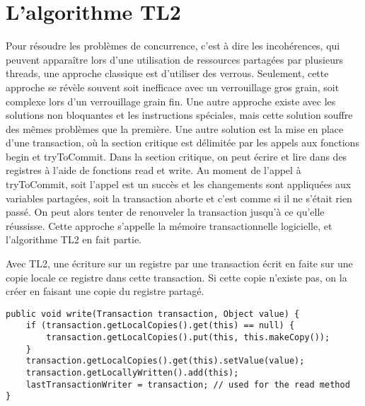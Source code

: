 \documentclass[10pt, a4paper]{article}
\title{\mytitle}
\author{\myauthor\hspace{1em}\\\contact\\Université de Nantes\hspace{0.5em}-\hspace{0.5em}\mymodule}
\date{}
\begin{document}
    \maketitle
    \begin{abstract}
	Ce document est un rapport du projet de mémoire transactionelle logicielle du module de programmation multi-coeurs. On discutera en particulier de la propriété de vivacité sur les transactions garantie par l’algorithme TL2.
    \end{abstract}

\section{L'algorithme TL2}
Pour résoudre les problèmes de concurrence, c'est à dire les incohérences, qui peuvent apparaître lors d'une utilisation de ressources partagées par plusieurs threads, une approche classique est d'utiliser des verrous.
Seulement, cette approche se révèle souvent soit inefficace avec un verrouillage gros grain, soit complexe lors d'un verrouillage grain fin. Une autre approche existe avec les solutions non bloquantes et les instructions spéciales, mais cette solution souffre des mêmes problèmes que la première. Une autre solution est la mise en place d'une transaction, où la section critique est délimitée par les appels aux fonctions begin et tryToCommit. Dans la section critique, on peut écrire et lire dans des registres à l'aide de fonctions read et write. Au moment de l'appel à tryToCommit, soit l'appel est un succès et les changements sont appliquées aux variables partagées, soit la transaction aborte et c'est comme si il ne s'était rien passé. On peut alors tenter de renouveler la transaction jusqu'à ce qu'elle réussisse. Cette approche s'appelle la mémoire transactionnelle logicielle, et l'algorithme TL2 en fait partie. 

Avec TL2, une écriture sur un registre par une transaction écrit en faite sur une copie locale ce registre dans cette transaction. Si cette copie n'existe pas, on la créer en faisant une copie du registre partagé.
\begin{lstlisting}[caption = write]
public void write(Transaction transaction, Object value) {
    if (transaction.getLocalCopies().get(this) == null) {
        transaction.getLocalCopies().put(this, this.makeCopy());
    }
    transaction.getLocalCopies().get(this).setValue(value);
    transaction.getLocallyWritten().add(this);
    lastTransactionWriter = transaction; // used for the read method
}
\end{lstlisting}
\end{document}
